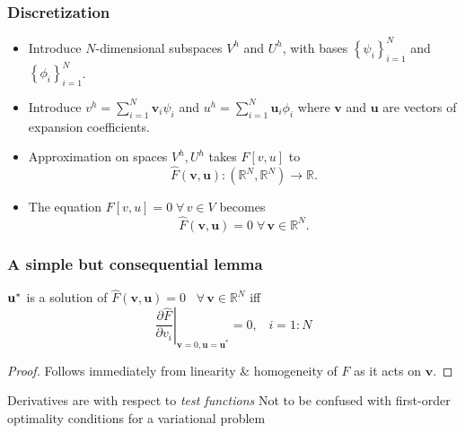 \documentclass[10pt,xcolor=dvipsnames]{beamer}
\newcommand{\pd}[2]{\frac{\partial #1}{\partial #2}}
\newcommand{\evalat}[2]{\left.#1\right\vert_{#2}}
\begin{document}
\frame
{
  \frametitle{Discretization}

\begin{block}{}
\begin{itemize}
\item Introduce $N$-dimensional subspaces $V^h$ and $U^h$, with bases
$\left\{\psi_i\right\}_{i=1}^N$ and $\left\{\phi_i\right\}_{i=1}^N$.
\item Introduce $v^h = \sum_{i=1}^N \mathbf{v}_i\psi_i$
and $u^h = \sum_{i=1}^N \mathbf{u}_i\phi_i$
where $\mathbf{v}$ and $\mathbf{u}$ are vectors of expansion coefficients.
\end{itemize}
\end{block}
\begin{block}{}
\begin{itemize}
\item Approximation on spaces $V^h,U^h$ takes $F\left[v,u\right]$
to
\[
{\hat F}(\mathbf{v},\mathbf{u}) : (\mathbb{R}^N, \mathbb{R}^N) \rightarrow \mathbb{R}.
\]
\item The equation $F\left[v,u\right]=0 \; \forall\, v \in V$ becomes
\[{\hat F}(\mathbf{v},\mathbf{u})=0 \; \forall\, \mathbf{v}\in\mathbb{R}^N.\]
\end{itemize}
\end{block}
}

\frame
{
  \frametitle{A simple but consequential lemma}

\begin{lemma}
${\bf u}^*$ is a solution of
${\hat F}(\mathbf{v},\mathbf{u})=0 \;\;\; \forall\, \mathbf{v}\in\mathbb{R}^N$
iff
\[
\evalat{\pd{\hat F}{v_i}}{\mathbf{v}=0,\mathbf{u}=\mathbf{u}^*}=0,
\;\;\;i=1:N 
\]
\end{lemma}
{
  \begin{proof}
  Follows immediately from linearity \& homogeneity of $F$ as it acts on $\mathbf{v}$.
  \end{proof}
}
{
  \begin{block}{Derivatives are with respect to {\it test functions}}
  Not to be confused with first-order optimality conditions for a variational problem
  \end{block}
}
}
\end{document}
